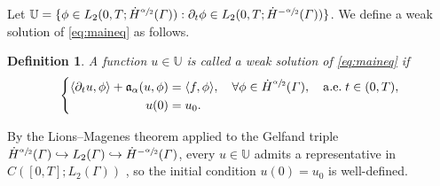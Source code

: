 \documentclass[numbers,webpdf]{ima-authoring-template}%
\theoremstyle{thmstyletwo}%
\newtheorem{definition}{Definition}
\numberwithin{equation}{section}
\newcommand{\almosteverywhere}{\mathrm{a.e.}\;}
\begin{document}
Let $\mathbb{U} = \{\phi\in L_2(0,T;\dot{H}^{\sfrac{\alpha}{2}}({\mit\varGamma})):\partial_t\phi\in L_2(0,T;\dot{H}^{-\sfrac{\alpha}{2}}({\mit\varGamma}))\}$. We define a weak solution of \eqref{eq:maineq} as follows.
\begin{definition}
    A function $u\in\mathbb{U}$ is called a \emph{weak solution} of \eqref{eq:maineq} if 
    \begin{equation}
\label{weakformofentireequation}
    \left\{
\begin{aligned}
    \langle\partial_tu,\phi\rangle + \mathfrak{a}_{\alpha}(u,\phi) &= \langle f,\phi\rangle,\quad\forall \phi\in \dot{H}^{\sfrac{\alpha}{2}}(\Gamma),\quad \almosteverywhere t\in(0,T),\\  
    u(0)&=u_0.
\end{aligned}
\right.
\end{equation}
\end{definition}
By the Lions--Magenes theorem applied to the Gelfand triple $\dot{H}^{\sfrac{\alpha}{2}}({\mit\varGamma})\hookrightarrow L_2({\mit\varGamma}) \hookrightarrow \dot{H}^{-\sfrac{\alpha}{2}}({\mit\varGamma})$, every $u\in\mathbb{U}$ admits a representative in $C([0,T];L_2(\Gamma))$ \cite{Evans2010Partial, Lions1972Nonhomogeneous}, so the initial condition $u(0)=u_0$ is well-defined.
\end{document}
